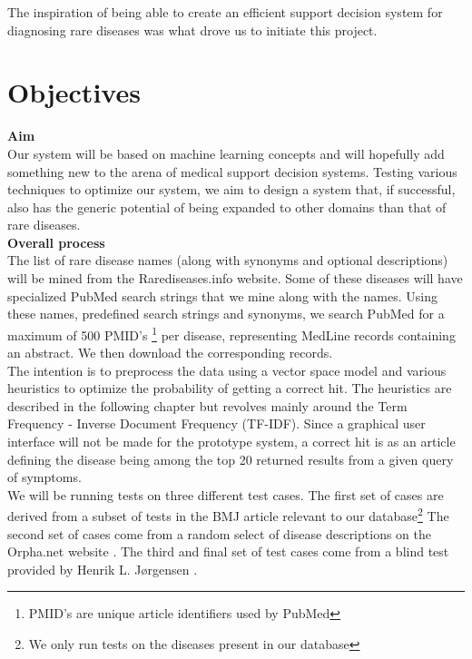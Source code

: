 The inspiration of being able to create an efficient support decision
system for diagnosing rare diseases was what drove us to initiate this
project.

\section{Objectives}

\textbf{Aim} \\
Our system will be based on machine learning concepts and will
hopefully add something new to the arena of medical support decision
systems. Testing various techniques to optimize our system, we aim to
design a system that, if successful, also has the generic potential of
being expanded to other domains than that of rare diseases.\\

\textbf{Overall process} \\
The list of rare disease names (along with synonyms and optional
descriptions) will be mined from the Rarediseases.info website. Some
of these diseases will have specialized PubMed search strings that we
mine along with the names. Using these names, predefined search
strings and synonyms, we search PubMed for a maximum of 500
PMID's \footnote{PMID's are unique article identifiers used by PubMed}
per disease, representing MedLine records containing an abstract. We
then download the corresponding records.\\

The intention is to preprocess the data using a vector space model and
various heuristics to optimize the probability of getting a correct
hit. The heuristics are described in the following chapter but
revolves mainly around the Term Frequency - Inverse Document Frequency
(TF-IDF). Since a graphical user interface will not be made for the
prototype system, a correct hit is as an article defining the disease
being among the top 20 returned results from a given query of
symptoms.\\

We will be running tests on three different test cases. The first set
of cases are derived from a subset of tests in the BMJ article
\cite{HangwiTang11102006} relevant to our database\footnote{We only
  run tests on the diseases present in our database} The second set of
cases come from a random select of disease descriptions on the
Orpha.net website \cite{Orphanet}. The third and final set of test
cases come from a blind test provided by Henrik L. Jørgensen
\cite{TheDude}.\\

